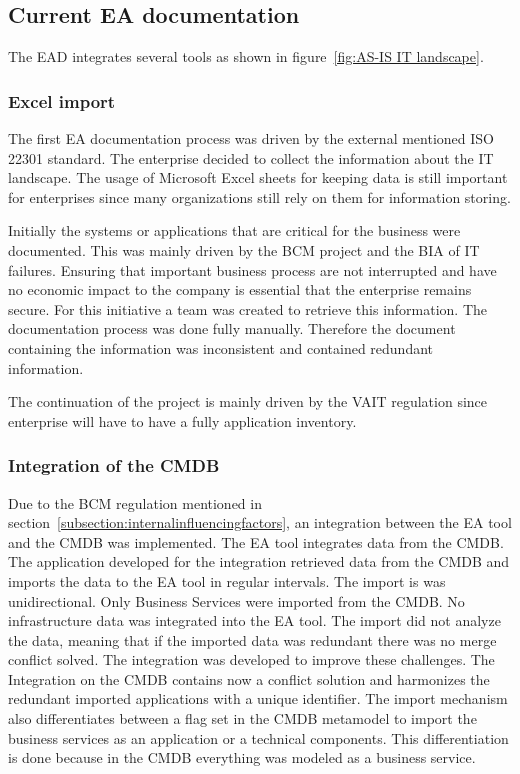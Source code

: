 \subsection{Current EA documentation}\label{subsection:currentead}

The EAD integrates several tools as shown in figure~\ref{fig:AS-IS IT landscape}. 
\subsubsection{Excel import}

The first EA documentation process was driven by the external mentioned ISO 22301 standard. The enterprise decided to collect the information about the IT landscape. The usage of Microsoft Excel sheets for keeping data is still important for enterprises since many organizations still rely on them for information storing.\hl{}

Initially the systems or applications that are critical for the business were documented. This was mainly driven by the BCM project and the BIA of IT failures. Ensuring that important business process are not interrupted and have no economic impact to the company is essential that the enterprise remains secure. For this initiative a team was created to retrieve this information. The documentation process was done fully manually. Therefore the document containing the information was inconsistent and contained redundant information.

The continuation of the project is mainly driven by the VAIT regulation since enterprise will have to have a fully application inventory.

\subsubsection{Integration of the CMDB}
Due to the BCM regulation mentioned in section~\ref{subsection:internalinfluencingfactors}, an integration between the EA tool and the CMDB was implemented. The EA tool integrates data from the CMDB. The application developed for the integration retrieved data from the CMDB and imports the data to the EA tool in regular intervals. The import is was unidirectional. Only Business Services were imported from the CMDB. No infrastructure data was integrated into the EA tool. The import did not analyze the data, meaning that if the imported data was redundant there was no merge conflict solved. The integration was developed to improve these challenges. The Integration on the CMDB contains now a conflict solution and harmonizes the redundant imported applications with a unique identifier. The import mechanism also differentiates between a flag set in the CMDB metamodel to import the business services as an application or a technical components. This differentiation is done because in the CMDB everything was modeled as a business service.

